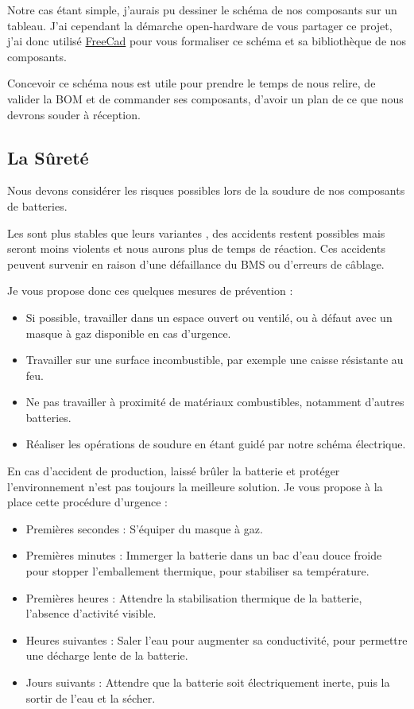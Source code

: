 \documentclass[a4paper,11pt]{article}
\newcommand{\LiFePoFour}[0]{\ce{LiFePO_4}}
\begin{document}
\begin{blogmain}
Notre cas étant simple, j'aurais pu dessiner le schéma de nos composants sur un tableau. J'ai cependant la démarche open-hardware de vous partager ce projet, j'ai donc utilisé \href{https://www.freecad}{FreeCad} pour vous formaliser ce schéma et sa bibliothèque de nos composants.


Concevoir ce schéma nous est utile pour prendre le temps de nous relire, de valider la BOM et de commander ses composants, d'avoir un plan de ce que nous devrons souder à réception.

\subsection{La Sûreté}
Nous devons considérer les risques possibles lors de la soudure de nos composants de batteries.

Les \LiFePoFour{} sont plus stables que leurs variantes , des accidents restent possibles mais seront moins violents et nous aurons plus de temps de réaction.
Ces accidents peuvent survenir en raison d'une défaillance du BMS ou d'erreurs de câblage.

Je vous propose donc ces quelques mesures de prévention :
\begin{itemize}
  \item Si possible, travailler dans un espace ouvert ou ventilé, ou à défaut avec un masque à gaz disponible en cas d'urgence.
  \item Travailler sur une surface incombustible, par exemple une caisse résistante au feu.
  \item Ne pas travailler à proximité de matériaux combustibles, notamment d'autres batteries.
  \item Réaliser les opérations de soudure en étant guidé par notre schéma électrique.
\end{itemize}

\newpage
En cas d'accident de production, laissé brûler la batterie et protéger l’environnement  n'est pas toujours la meilleure solution.
Je vous propose à la place cette procédure d'urgence :
\begin{itemize}
  \item \Interval{} Premières secondes : S'équiper du masque à gaz.
  \item {} Premières minutes : Immerger la batterie dans un bac d'eau douce froide pour stopper l'emballement thermique, pour stabiliser sa température.
  \item {} Premières heures : Attendre la stabilisation thermique de la batterie, l'absence d’activité visible.
  \item {} Heures suivantes : Saler l'eau pour augmenter sa conductivité, pour permettre une décharge lente de la batterie.
  \item {} Jours suivants : Attendre que la batterie soit électriquement inerte, puis la sortir de l'eau et la sécher.
\end{itemize}


\end{blogmain}
\end{document}
